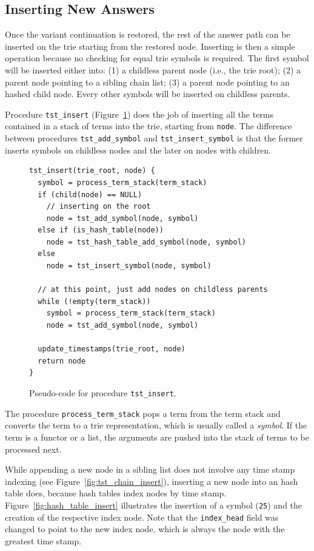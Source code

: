 \subsection{Inserting New Answers}

Once the variant continuation is restored, the rest of the answer path can be inserted on the trie starting
from the restored node. Inserting is then a simple operation because no checking for equal trie symbols is required.
The first symbol will be inserted either into: (1) a childless parent node (i.e., the trie root);
(2) a parent node pointing to a sibling chain list; (3) a parent node pointing to an hashed child node.
Every other symbols will be inserted on childless parents.

Procedure \texttt{tst\_insert} (Figure~\ref{fig:tst_insert}) does the job of inserting
all the terms contained in a stack of terms into the trie, starting from \texttt{node}.
The difference between procedures \texttt{tst\_add\_symbol} and \texttt{tst\_insert\_symbol}
is that the former inserts symbols on childless nodes and the later on nodes with children.

\begin{figure}[ht]
\begin{Verbatim}
tst_insert(trie_root, node) {
  symbol = process_term_stack(term_stack)
  if (child(node) == NULL)
    // inserting on the root
    node = tst_add_symbol(node, symbol)
  else if (is_hash_table(node))
    node = tst_hash_table_add_symbol(node, symbol)
  else
    node = tst_insert_symbol(node, symbol)
  
  // at this point, just add nodes on childless parents
  while (!empty(term_stack))
    symbol = process_term_stack(term_stack)
    node = tst_add_symbol(node, symbol)
  
  update_timestamps(trie_root, node)
  return node
}
\end{Verbatim}
\caption{Pseudo-code for procedure \texttt{tst\_insert}.}
\label{fig:tst_insert}
\end{figure}

The procedure \texttt{process\_term\_stack} pops a term from the term stack and converts the term
to a trie representation, which is usually called a \textit{symbol}. If the term is a functor or a list,
the arguments are pushed into the stack of terms to be processed next.

While appending a new node in a sibling list does not involve any
time stamp indexing (see Figure~\ref{fig:tst_chain_insert}), inserting a new node into an hash table does,
because hash tables index nodes by time stamp.
Figure~\ref{fig:hash_table_insert}
illustrates the insertion of a symbol (\texttt{25}) and the creation of the respective
index node. Note that the \texttt{index\_head} field was changed to point to the new index node,
which is always the node with the greatest time stamp.

